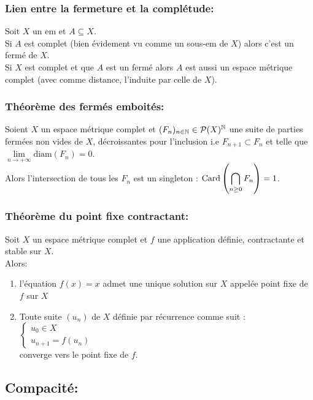 \documentclass[12pt,a4paper]{article}
\begin{document}
	\subsubsection{Lien entre la fermeture et la complétude:} Soit $X$ un em et $A\subseteq X$.\\
	Si $A$ est complet (bien évidement vu comme un sous-em de $X$) alors c'est un fermé de $X$.\\
	Si $X$ est complet et que $A$ est un fermé alors $A$ est aussi un espace métrique complet (avec comme distance, l'induite par celle de $X$). 
	
	\subsubsection{Théorème des fermés emboités:} Soient $X$ un espace métrique complet et $(F_n)_{n\in \mathbb{N}}\in \mathcal{P}(X)^{\mathbb{N}}$ une suite de parties fermées non vides de $X$, décroissantes pour l'inclusion i.e $F_{n+1} \subset F_n$ et telle que $\lim\limits_{n\to +\infty} \text{diam}(F_n)=0$.\\
	Alors l'intersection de tous les $F_n$ est un singleton : $\displaystyle \text{Card}\left( \bigcap\limits_{n\geq 0} F_n\right)=1 $.
	
	\subsubsection{Théorème du point fixe contractant:} Soit $X$ un espace métrique complet et $f$ une application définie, contractante et stable sur $X$.\\
	Alors:
	\begin{enumerate}
		\item  l'équation $f(x)=x$ admet une unique solution sur $X$ appelée point fixe de $f$ sur $X$
		\item Toute suite $(u_n)$ de $X$ définie par récurrence comme suit : $\begin{cases}
			u_0\in X\\ u_{n+1}=f(u_n)
		\end{cases}$  \\converge vers le point fixe de $f$.
	\end{enumerate}
	\subsection{Compacité:}
\end{document}
